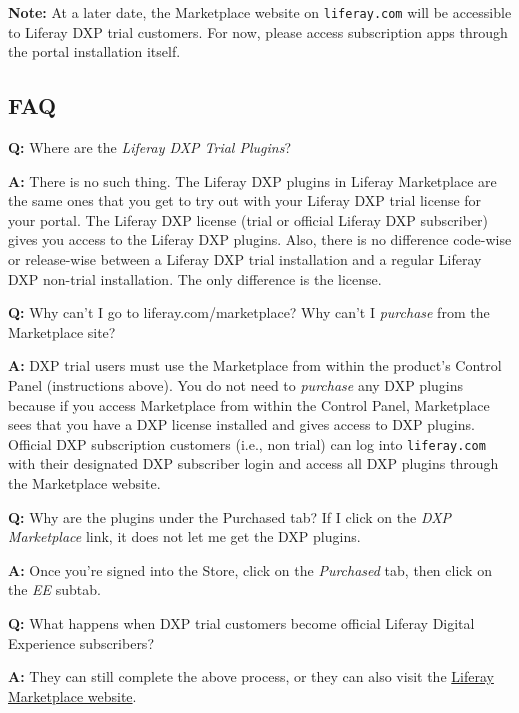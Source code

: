 \noindent\hrulefill

\textbf{Note:} At a later date, the Marketplace website on
\texttt{liferay.com} will be accessible to Liferay DXP trial customers.
For now, please access subscription apps through the portal installation
itself.

\noindent\hrulefill

\subsection{FAQ}\label{faq}

\textbf{Q:} Where are the \emph{Liferay DXP Trial Plugins}?

\textbf{A:} There is no such thing. The Liferay DXP plugins in Liferay
Marketplace are the same ones that you get to try out with your Liferay
DXP trial license for your portal. The Liferay DXP license (trial or
official Liferay DXP subscriber) gives you access to the Liferay DXP
plugins. Also, there is no difference code-wise or release-wise between
a Liferay DXP trial installation and a regular Liferay DXP non-trial
installation. The only difference is the license.

\textbf{Q:} Why can't I go to liferay.com/marketplace? Why can't I
\emph{purchase} from the Marketplace site?

\textbf{A:} DXP trial users must use the Marketplace from within the
product's Control Panel (instructions above). You do not need to
\emph{purchase} any DXP plugins because if you access Marketplace from
within the Control Panel, Marketplace sees that you have a DXP license
installed and gives access to DXP plugins. Official DXP subscription
customers (i.e., non trial) can log into \texttt{liferay.com} with their
designated DXP subscriber login and access all DXP plugins through the
Marketplace website.

\textbf{Q:} Why are the plugins under the Purchased tab? If I click on
the \emph{DXP Marketplace} link, it does not let me get the DXP plugins.

\textbf{A:} Once you're signed into the Store, click on the
\emph{Purchased} tab, then click on the \emph{EE} subtab.

\textbf{Q:} What happens when DXP trial customers become official
Liferay Digital Experience subscribers?

\textbf{A:} They can still complete the above process, or they can also
visit the \href{https://www.liferay.com/marketplace}{Liferay Marketplace
website}.


